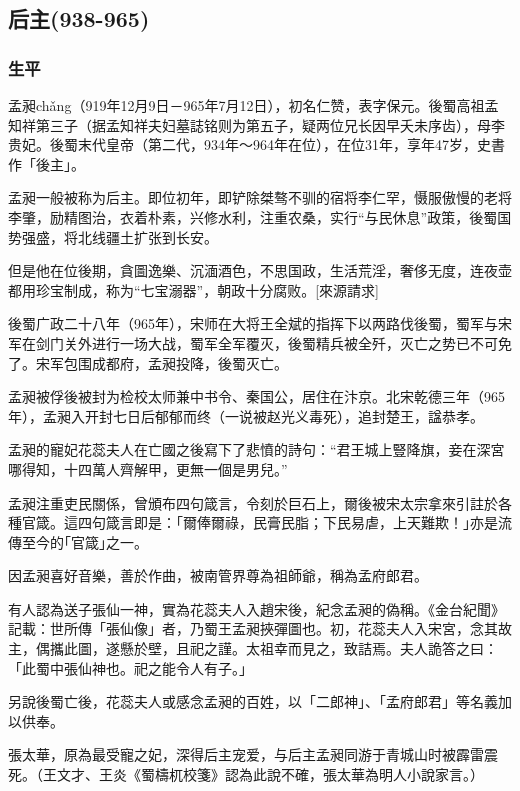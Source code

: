 
\subsection{后主\tiny(938-965)}

\subsubsection{生平}

孟昶chǎng（919年12月9日－965年7月12日），初名仁赞，表字保元。後蜀高祖孟知祥第三子（据孟知祥夫妇墓誌铭则为第五子，疑两位兄长因早夭未序齿），母李贵妃。後蜀末代皇帝（第二代，934年～964年在位），在位31年，享年47岁，史書作「後主」。

孟昶一般被称为后主。即位初年，即铲除桀骜不驯的宿将李仁罕，慑服傲慢的老将李肇，励精图治，衣着朴素，兴修水利，注重农桑，实行“与民休息”政策，後蜀国势强盛，将北线疆土扩张到长安。

但是他在位後期，貪圖逸樂、沉湎酒色，不思国政，生活荒淫，奢侈无度，连夜壶都用珍宝制成，称为“七宝溺器”，朝政十分腐败。[來源請求]

後蜀广政二十八年（965年），宋师在大将王全斌的指挥下以两路伐後蜀，蜀军与宋军在剑门关外进行一场大战，蜀军全军覆灭，後蜀精兵被全歼，灭亡之势已不可免了。宋军包围成都府，孟昶投降，後蜀灭亡。

孟昶被俘後被封为检校太师兼中书令、秦国公，居住在汴京。北宋乾德三年（965年），孟昶入开封七日后郁郁而终（一说被赵光义毒死），追封楚王，諡恭孝。

孟昶的寵妃花蕊夫人在亡國之後寫下了悲憤的詩句：“君王城上豎降旗，妾在深宮哪得知，十四萬人齊解甲，更無一個是男兒。”

孟昶注重吏民關係，曾頒布四句箴言，令刻於巨石上，爾後被宋太宗拿來引註於各種官箴。這四句箴言即是：｢爾俸爾祿，民膏民脂；下民易虐，上天難欺！｣亦是流傳至今的｢官箴｣之一。

因孟昶喜好音樂，善於作曲，被南管界尊為祖師爺，稱為孟府郎君。

有人認為送子張仙一神，實為花蕊夫人入趙宋後，紀念孟昶的偽稱。《金台紀聞》記載：世所傳「張仙像」者，乃蜀王孟昶挾彈圖也。初，花蕊夫人入宋宮，念其故主，偶攜此圖，遂懸於壁，且祀之謹。太祖幸而見之，致詰焉。夫人詭答之曰：「此蜀中張仙神也。祀之能令人有子。」

另說後蜀亡後，花蕊夫人或感念孟昶的百姓，以「二郎神」、「孟府郎君」等名義加以供奉。

張太華，原為最受寵之妃，深得后主宠爱，与后主孟昶同游于青城山时被霹雷震死。（王文才、王炎《蜀檮杌校箋》認為此說不確，張太華為明人小說家言。）


